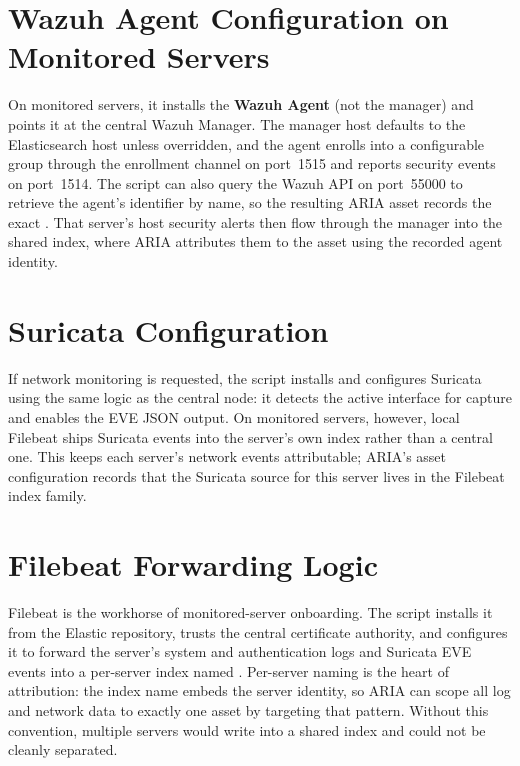 

\section{Wazuh Agent Configuration on Monitored Servers}

On monitored servers, it installs the \textbf{Wazuh Agent} (not the manager) and points it at the central Wazuh Manager. The manager host defaults to the Elasticsearch host unless overridden, and the agent enrolls into a configurable group through the enrollment channel on port~1515 and reports security events on port~1514. The script can also query the Wazuh API on port~55000 to retrieve the agent's identifier by name, so the resulting ARIA asset records the exact . That server's host security alerts then flow through the manager into the shared  index, where ARIA attributes them to the asset using the recorded agent identity.

\section{Suricata Configuration}

If network monitoring is requested, the script installs and configures Suricata using the same logic as the central node: it detects the active interface for capture and enables the EVE JSON output. On monitored servers, however, local Filebeat ships Suricata events into the server's own  index rather than a central one. This keeps each server's network events attributable; ARIA's asset configuration records that the Suricata source for this server lives in the Filebeat index family.

\section{Filebeat Forwarding Logic}

Filebeat is the workhorse of monitored-server onboarding. The script installs it from the Elastic repository, trusts the central certificate authority, and configures it to forward the server's system and authentication logs and Suricata EVE events into a per-server index named . Per-server naming is the heart of attribution: the index name embeds the server identity, so ARIA can scope all log and network data to exactly one asset by targeting that pattern. Without this convention, multiple servers would write into a shared index and could not be cleanly separated.

